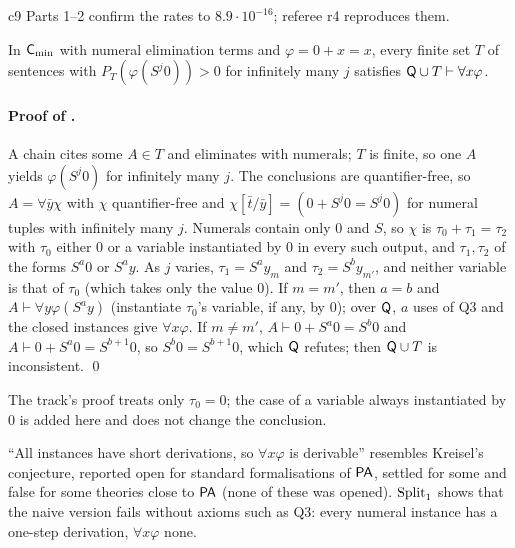 c9 Parts 1--2 confirm the rates to $8.9\cdot10^{-16}$; referee r4 reproduces them.

\begin{lemma}\label{lem:univ:survivors}
In $\mathsf{C}_{\min}$ with numeral elimination terms and $\varphi=0+x=x$, every finite set $T$ of sentences with $P_T(\varphi(S^j0))>0$ for infinitely many $j$ satisfies $\mathsf{Q}\cup T\vdash\forall x\varphi$.
\end{lemma}

\paragraph{Proof of .} A chain cites some $A\in T$ and eliminates with numerals; $T$ is finite, so one $A$ yields $\varphi(S^j0)$ for infinitely many $j$. The conclusions are quantifier-free, so $A=\forall\bar y\chi$ with $\chi$ quantifier-free and $\chi[\bar t/\bar y]=(0+S^j0=S^j0)$ for numeral tuples with infinitely many $j$. Numerals contain only $0$ and $S$, so $\chi$ is $\tau_0+\tau_1=\tau_2$ with $\tau_0$ either $0$ or a variable instantiated by $0$ in every such output, and $\tau_1,\tau_2$ of the forms $S^a0$ or $S^ay$. As $j$ varies, $\tau_1=S^ay_m$ and $\tau_2=S^by_{m'}$, and neither variable is that of $\tau_0$ (which takes only the value $0$). If $m=m'$, then $a=b$ and $A\vdash\forall y\varphi(S^ay)$ (instantiate $\tau_0$'s variable, if any, by $0$); over $\mathsf{Q}$, $a$ uses of Q3 and the closed instances give $\forall x\varphi$. If $m\neq m'$, $A\vdash0+S^a0=S^b0$ and $A\vdash0+S^a0=S^{b+1}0$, so $S^b0=S^{b+1}0$, which $\mathsf{Q}$ refutes; then $\mathsf{Q}\cup T$ is inconsistent. \qed

The track's proof treats only $\tau_0=0$; the case of a variable always instantiated by $0$ is added here and does not change the conclusion.

\begin{remark}\label{rem:univ:kreisel}
``All instances have short derivations, so $\forall x\varphi$ is derivable'' resembles Kreisel's conjecture, reported open for standard formalisations of $\mathsf{PA}$, settled for some \citep{parikh1973some,baaz1993kreisel} and false for some theories close to $\mathsf{PA}$ \citep{hrubes2007theories} (none of these was opened). $\mathrm{Split}_1$ shows that the naive version fails without axioms such as Q3: every numeral instance has a one-step derivation, $\forall x\varphi$ none.
\end{remark}

